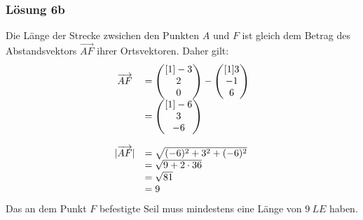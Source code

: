 \documentclass[main.tex]{subfiles}
\begin{document}
\subsubsection{Lösung 6b}
Die Länge der Strecke zwsichen den Punkten $A$ und $F$ ist gleich dem Betrag des Abstandsvektors $\overrightarrow{AF}$ ihrer Ortsvektoren. Daher gilt:
\begin{equation*}
    \begin{array}{ c l }
    \overrightarrow{AF} & =\begin{pmatrix}[1]
    -3\\
    2\\
    0
    \end{pmatrix} -\begin{pmatrix}[1]
    3\\
    -1\\
    6
    \end{pmatrix}\\
    & =\begin{pmatrix}[1]
    -6\\
    3\\
    -6
    \end{pmatrix}\\
    & \\
    | \overrightarrow{AF}|  & =\sqrt{( -6)^{2} +3^{2} +( -6)^{2}}\\
    & =\sqrt{9+2\cdotp 36}\\
    & =\sqrt{81}\\
    & =9
    \end{array}
\end{equation*}
Das an dem Punkt $F$ befestigte Seil muss mindestens eine Länge von $9\ LE$ haben.
\end{document}

